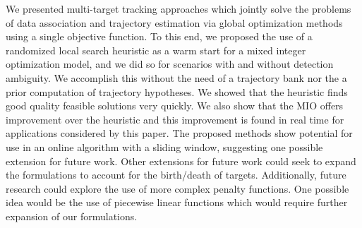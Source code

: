We presented multi-target tracking approaches which jointly solve the problems of data association and trajectory estimation via global optimization methods using a single objective function. To this end, we proposed the use of a randomized local search heuristic as a warm start for a mixed integer optimization model, and we did so for scenarios with and without detection ambiguity. We accomplish this without the need of a trajectory bank nor the a prior computation of trajectory hypotheses. We showed that the heuristic finds good quality feasible solutions very quickly. We also show that the MIO offers improvement over the heuristic and this improvement is found in real time for applications considered by this paper.  The proposed methods show potential for use in an online algorithm with a sliding window, suggesting one possible extension for future work. Other extensions for future work could seek to expand the formulations to account for the birth/death of targets. Additionally, future research could explore the use of more complex penalty functions. One possible idea would be the use of piecewise linear functions which would require further expansion of our formulations. 